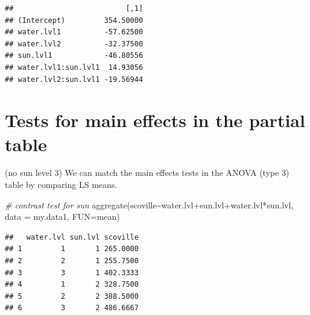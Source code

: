 \documentclass[
]{book}
\newenvironment{Shaded}{\begin{snugshade}}{\end{snugshade}}
\newcommand{\AttributeTok}[1]{\textcolor[rgb]{0.77,0.63,0.00}{#1}}
\newcommand{\CommentTok}[1]{\textcolor[rgb]{0.56,0.35,0.01}{\textit{#1}}}
\newcommand{\DecValTok}[1]{\textcolor[rgb]{0.00,0.00,0.81}{#1}}
\newcommand{\FunctionTok}[1]{\textcolor[rgb]{0.00,0.00,0.00}{#1}}
\newcommand{\NormalTok}[1]{#1}
\newcommand{\OtherTok}[1]{\textcolor[rgb]{0.56,0.35,0.01}{#1}}
\newcommand{\SpecialCharTok}[1]{\textcolor[rgb]{0.00,0.00,0.00}{#1}}
\begin{document}
\begin{Shaded}
\end{Shaded}

\begin{verbatim}
##                          [,1]
## (Intercept)         354.50000
## water.lvl1          -57.62500
## water.lvl2          -32.37500
## sun.lvl1            -46.80556
## water.lvl1:sun.lvl1  14.93056
## water.lvl2:sun.lvl1 -19.56944
\end{verbatim}

\hypertarget{tests-for-main-effects-in-the-partial-table}{%
\section{Tests for main effects in the partial table}\label{tests-for-main-effects-in-the-partial-table}}

(no sun level 3)
We can match the main effects tests in the ANOVA (type 3) table by comparing LS means.

\begin{Shaded}
\begin{Highlighting}[]
\CommentTok{\# contrast test for sun}
\FunctionTok{aggregate}\NormalTok{(scoville}\SpecialCharTok{\textasciitilde{}}\NormalTok{water.lvl}\SpecialCharTok{+}\NormalTok{sun.lvl}\SpecialCharTok{+}\NormalTok{water.lvl}\SpecialCharTok{*}\NormalTok{sun.lvl, }\AttributeTok{data =}\NormalTok{ my.data1, }\AttributeTok{FUN=}\NormalTok{mean)}
\end{Highlighting}
\end{Shaded}

\begin{verbatim}
##   water.lvl sun.lvl scoville
## 1         1       1 265.0000
## 2         2       1 255.7500
## 3         3       1 402.3333
## 4         1       2 328.7500
## 5         2       2 388.5000
## 6         3       2 486.6667
\end{verbatim}

\begin{Shaded}
\end{Shaded}
\end{document}
